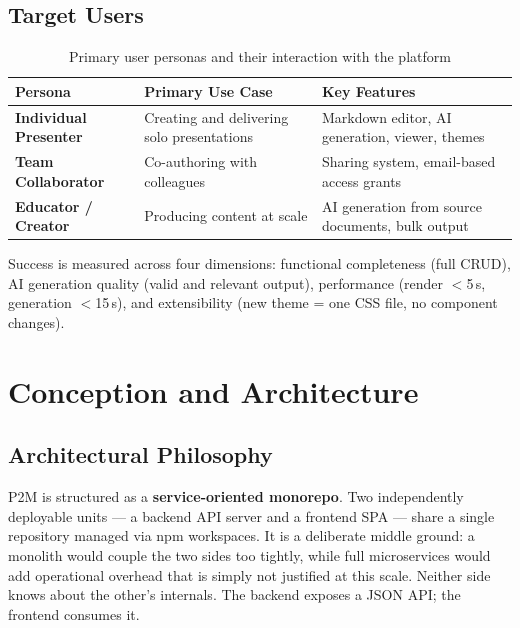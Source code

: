 \documentclass[10pt,a4paper]{article}
\begin{document}
\subsection{Target Users}

\begin{table}[h!]
\centering
\small
\renewcommand{\arraystretch}{1.2}
\begin{tabularx}{\linewidth}{@{} >{\bfseries}l X X @{}}
\toprule
Persona & Primary Use Case & Key Features \\
\midrule
Individual Presenter   & Creating and delivering solo presentations & Markdown editor, AI generation, viewer, themes \\
Team Collaborator      & Co-authoring with colleagues               & Sharing system, email-based access grants \\
Educator / Creator     & Producing content at scale                 & AI generation from source documents, bulk output \\
\bottomrule
\end{tabularx}
\vspace{-0.5em}\caption{Primary user personas and their interaction with the platform}
\end{table}

Success is measured across four dimensions: functional completeness (full CRUD), AI generation quality (valid and relevant output), performance (render $<$5\,s, generation $<$15\,s), and extensibility (new theme = one CSS file, no component changes).

\section{Conception and Architecture}

\subsection{Architectural Philosophy}

P2M is structured as a \textbf{service-oriented monorepo}. Two independently deployable units --- a backend API server and a frontend SPA --- share a single repository managed via npm workspaces. It is a deliberate middle ground: a monolith would couple the two sides too tightly, while full microservices would add operational overhead that is simply not justified at this scale. Neither side knows about the other's internals. The backend exposes a JSON API; the frontend consumes it.
\end{document}
